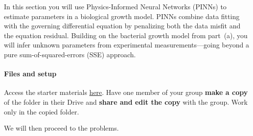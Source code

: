 \documentclass{exam}
\begin{document}
In this section you will use Physics-Informed Neural Networks (PINNs) to estimate parameters in a biological growth model. PINNs combine data fitting with the governing differential equation by penalizing both the data misfit and the equation residual. Building on the bacterial growth model from part~(a), you will infer unknown parameters from experimental measurements—going beyond a pure sum-of-squared-errors (SSE) approach.

\paragraph{Files and setup}
Access the starter materials \href{https://drive.google.com/drive/folders/10YSAciWFgAvxpZKgGNzzt9tpcDoNeF4W?usp=sharing}{here}. Have one member of your group \textbf{make a copy} of the folder in their Drive and \textbf{share and edit the copy} with the group. Work only in the copied folder.

We will then proceed to the problems.
\end{document}
